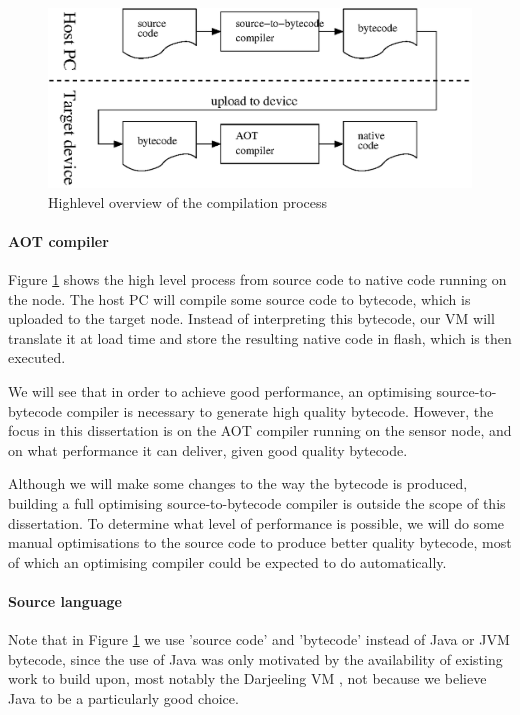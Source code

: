 \begin{figure}
\centering
\includegraphics[width=0.8\linewidth]{compilation-process-highlevel.eps}
\caption{Highlevel overview of the compilation process}
\label{fig-compilation-process-highlevel}
\end{figure}

\paragraph{AOT compiler}
Figure \ref{fig-compilation-process-highlevel} shows the high level process from source code to native code running on the node. The host PC will compile some source code to bytecode, which is uploaded to the target node. Instead of interpreting this bytecode, our VM will translate it at load time and store the resulting native code in flash, which is then executed.

We will see that in order to achieve good performance, an optimising source-to-bytecode compiler is necessary to generate high quality bytecode. However, the focus in this dissertation is on the AOT compiler running on the sensor node, and on what performance it can deliver, given good quality bytecode.

Although we will make some changes to the way the bytecode is produced, building a full optimising source-to-bytecode compiler is outside the scope of this dissertation. To determine what level of performance is possible, we will do some manual optimisations to the source code to produce better quality bytecode, most of which an optimising compiler could be expected to do automatically.

\paragraph{Source language}
Note that in Figure \ref{fig-compilation-process-highlevel} we use 'source code' and 'bytecode' instead of Java or JVM bytecode, since the use of Java was only motivated by the availability of existing work to build upon, most notably the Darjeeling VM \cite{Brouwers:2009cj}, not because we believe Java to be a particularly good choice.

